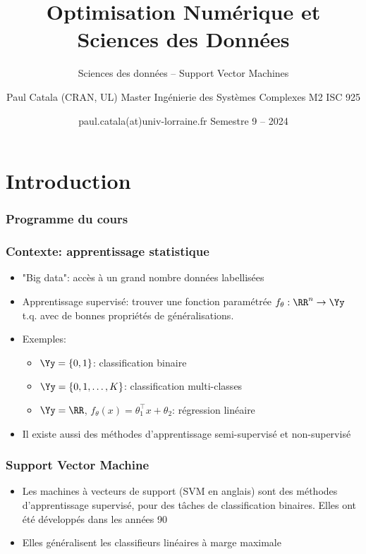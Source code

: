 \documentclass[9pt,table]{beamer} %
\title{Optimisation Numérique et Sciences des Données}
\subtitle{Sciences des données -- Support Vector Machines}
\author{Paul Catala (CRAN, UL) \hfill Master Ingénierie des Systèmes Complexes M2 ISC 925}
\date{paul.catala(at)univ-lorraine.fr \hfill Semestre 9 -- 2024 \\}
\begin{document}
\maketitle



\section{Introduction}

\begin{frame}
\frametitle{Programme du cours}
\tableofcontents[currentsection]
\end{frame}

\begin{frame}
\frametitle{Contexte: apprentissage statistique}

\begin{itemize}[label=\tiny$\blacksquare$]
	\item "Big data": accès à un grand nombre données \alert{labellisées}
	
	\item \alert{Apprentissage supervisé}: trouver une fonction \alert{paramétrée} $f_\theta : \RR^n \to \Yy$ t.q.
	avec de bonnes propriétés de généralisations.
	
	\item Exemples: 
	\begin{itemize}[label=-]
		\item $\Yy = \{0,1\}$: \alert{classification binaire}
		\item $\Yy = \{0,1,\ldots,K\}$: classification multi-classes
		\item $\Yy = \RR$, $f_{\theta}(x) = \theta_1^\top x + \theta_2$: \alert{régression linéaire}
		
	\end{itemize}
	\item Il existe aussi des méthodes d'apprentissage semi-supervisé et non-supervisé
\end{itemize}
\end{frame}


\begin{frame}
\frametitle{Support Vector Machine}

\begin{itemize}[label=\tiny$\blacksquare$]
	\item Les machines à vecteurs de support (SVM en anglais) sont des méthodes d'apprentissage supervisé, pour des tâches de classification binaires. Elles ont été développés dans les années 90
	
	\item Elles généralisent les classifieurs linéaires à marge maximale
\end{itemize}
\end{frame}
\end{document}
